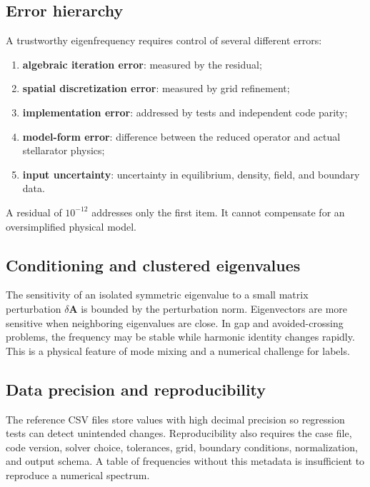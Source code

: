 \subsection{Error hierarchy}
A trustworthy eigenfrequency requires control of several different errors:
\begin{enumerate}[leftmargin=1.6em]
\item \textbf{algebraic iteration error}: measured by the residual;
\item \textbf{spatial discretization error}: measured by grid refinement;
\item \textbf{implementation error}: addressed by tests and independent code parity;
\item \textbf{model-form error}: difference between the reduced operator and actual stellarator physics;
\item \textbf{input uncertainty}: uncertainty in equilibrium, density, field, and boundary data.
\end{enumerate}
A residual of $10^{-12}$ addresses only the first item. It cannot compensate for an oversimplified physical model.

\subsection{Conditioning and clustered eigenvalues}
The sensitivity of an isolated symmetric eigenvalue to a small matrix perturbation $\delta\mathbf A$ is bounded by the perturbation norm. Eigenvectors are more sensitive when neighboring eigenvalues are close. In gap and avoided-crossing problems, the frequency may be stable while harmonic identity changes rapidly. This is a physical feature of mode mixing and a numerical challenge for labels.

\subsection{Data precision and reproducibility}
The reference CSV files store values with high decimal precision so regression tests can detect unintended changes. Reproducibility also requires the case file, code version, solver choice, tolerances, grid, boundary conditions, normalization, and output schema. A table of frequencies without this metadata is insufficient to reproduce a numerical spectrum.

